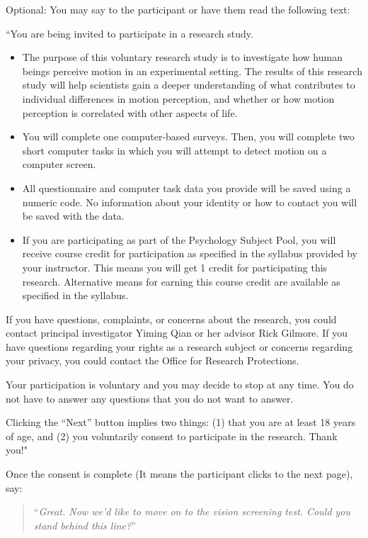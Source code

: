 \documentclass[]{article}
\providecommand{\tightlist}{%
  \setlength{\itemsep}{0pt}\setlength{\parskip}{0pt}}
\begin{document}
Optional: You may say to the participant or have them read the following
text:

``You are being invited to participate in a research study.

\begin{itemize}
\tightlist
\item
  The purpose of this voluntary research study is to investigate how
  human beings perceive motion in an experimental setting. The results
  of this research study will help scientists gain a deeper
  understanding of what contributes to individual differences in motion
  perception, and whether or how motion perception is correlated with
  other aspects of life.
\item
  You will complete one computer-based surveys. Then, you will complete
  two short computer tasks in which you will attempt to detect motion on
  a computer screen.
\item
  All questionnaire and computer task data you provide will be saved
  using a numeric code. No information about your identity or how to
  contact you will be saved with the data.
\item
  If you are participating as part of the Psychology Subject Pool, you
  will receive course credit for participation as specified in the
  syllabus provided by your instructor. This means you will get 1 credit
  for participating this research. Alternative means for earning this
  course credit are available as specified in the syllabus.
\end{itemize}

If you have questions, complaints, or concerns about the research, you
could contact principal investigator Yiming Qian or her advisor Rick
Gilmore. If you have questions regarding your rights as a research
subject or concerns regarding your privacy, you could contact the Office
for Research Protections.

Your participation is voluntary and you may decide to stop at any time.
You do not have to answer any questions that you do not want to answer.

Clicking the ``Next'' button implies two things: (1) that you are at
least 18 years of age, and (2) you voluntarily consent to participate in
the research. Thank you!"

Once the consent is complete (It means the participant clicks to the
next page), say:

\begin{quote}
``\emph{Great. Now we'd like to move on to the vision screening test.
Could you stand behind this line?}''
\end{quote}
\end{document}
